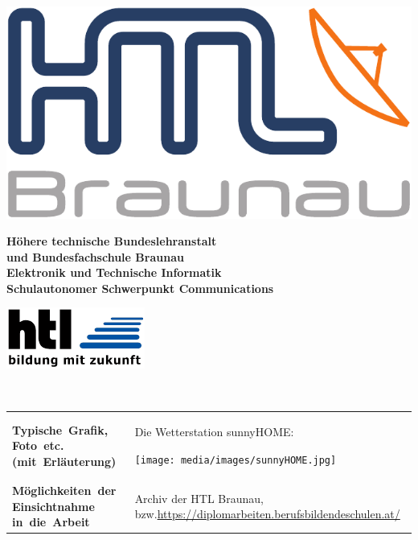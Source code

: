 \pagebreak
\thispagestyle{empty}

\begin{minipage}[c]{0.20\linewidth}
\includegraphics[width=0.8\linewidth]{media/images/htl_c_cmyk_rein}
\end{minipage}
\begin{minipage}[c]{0.6\linewidth}
\begin{center}
{\bfseries\sffamily\large Höhere  technische  Bundeslehranstalt\\
und  Bundesfachschule  Braunau\\
Elektronik und Technische Informatik\\
{\normalsize Schulautonomer Schwerpunkt Communications} }
\end{center}
\end{minipage}
\begin{minipage}[c]{0.2\linewidth}
\hfill \includegraphics[width=0.8\linewidth]{media/images/htl-bildung-mit-zukunft}
\end{minipage}\\

\vspace{1em}

\renewcommand{\arraystretch}{2}
\begin{tabularx}{1\textwidth}{ p{3.5cm} X }

\textbf{\mbox{Typische Grafik,} \mbox{Foto etc.} \mbox{(mit Erläuterung)}} & 
{
Die Wetterstation sunnyHOME:
\begin{center}
	\texttt{[image: media/images/sunnyHOME.jpg]}
\end{center}
} \\


\textbf{\mbox{Möglichkeiten der} Einsichtnahme \mbox{in die Arbeit}} & 
{Archiv der HTL Braunau, bzw.\newline \url{https://diplomarbeiten.berufsbildendeschulen.at/}} \\


\end{tabularx}





